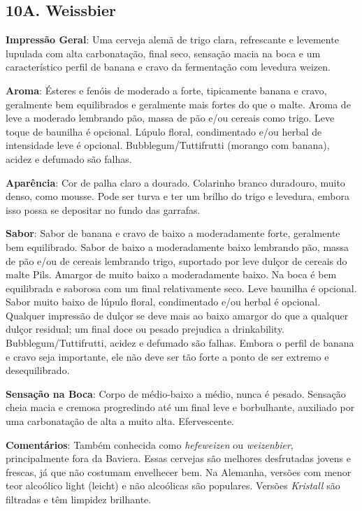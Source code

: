 \subsection*{10A. Weissbier}
\textbf{Impressão Geral}: Uma cerveja alemã de trigo clara, refrescante e levemente lupulada com alta carbonatação, final seco, sensação macia na boca e um característico perfil de banana e cravo da fermentação com levedura weizen.

\textbf{Aroma}: Ésteres e fenóis de moderado a forte, tipicamente banana e cravo, geralmente bem equilibrados e geralmente mais fortes do que o malte. Aroma de leve a moderado lembrando pão, massa de pão e/ou cereais como trigo. Leve toque de baunilha é opcional. Lúpulo floral, condimentado e/ou herbal de intensidade leve é opcional. Bubblegum/Tuttifrutti (morango com banana), acidez e defumado são falhas.

\textbf{Aparência}: Cor de palha claro a dourado. Colarinho branco duradouro, muito denso, como mousse. Pode ser turva e ter um brilho do trigo e levedura, embora isso possa se depositar no fundo das garrafas.

\textbf{Sabor}: Sabor de banana e cravo de baixo a moderadamente forte, geralmente bem equilibrado. Sabor de baixo a moderadamente baixo lembrando pão, massa de pão e/ou de cereais lembrando trigo, suportado por leve dulçor de cereais do malte Pils. Amargor de muito baixo a moderadamente baixo. Na boca é bem equilibrada e saborosa com um final relativamente seco. Leve baunilha é opcional. Sabor muito baixo de lúpulo floral, condimentado e/ou herbal é opcional. Qualquer impressão de dulçor se deve mais ao baixo amargor do que a qualquer dulçor residual; um final doce ou pesado prejudica a drinkability. Bubblegum/Tuttifrutti, acidez e defumado são falhas. Embora o perfil de banana e cravo seja importante, ele não deve ser tão forte a ponto de ser extremo e desequilibrado.

\textbf{Sensação na Boca}: Corpo de médio-baixo a médio, nunca é pesado. Sensação cheia macia e cremosa progredindo até um final leve e borbulhante, auxiliado por uma carbonatação de alta a muito alta. Efervescente.

\textbf{Comentários}: Também conhecida como \textit{hefeweizen} ou \textit{weizenbier}, principalmente fora da Baviera. Essas cervejas são melhores desfrutadas jovens e frescas, já que não costumam envelhecer bem. Na Alemanha, versões com menor teor alcoólico light (leicht) e não alcoólicas são populares. Versões \textit{Kristall} são filtradas e têm limpidez brilhante.


